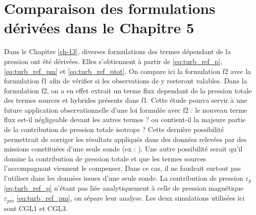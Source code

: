  \section{Comparaison des formulations dérivées dans le Chapitre 5}
 \label{an:compa_form}
 Dans le Chapitre \ref{ch-13}, diverses formulations des termes dépendant de la pression ont été dérivées. Elles s'obtiennent à partir de \eqref{eq:turb_ref_p}, \eqref{eq:turb_ref_pm} et  \eqref{eq:turb_ref_ptot}. On compare ici la formulation f2 avec la formulation f1 afin de vérifier si les observations de  y resteront valables. Dans la formulation f2, on a en effet extrait un terme flux dependant de la pression totale des termes sources et hybrides présents dans f1. Cette étude pourra servir à une future application observationnelle d'une loi formulée avec f2 : le nouveau terme flux est-il négligeable devant les autres termes ? ou contient-il la majeure partie de la contribution de pression totale isotrope ? Cette dernière possibilité permettrait de corriger les résultats appliqués dans des données relevées par des missions constituées d'une seule sonde (ex : ). Une autre possibilité serait qu'il domine la contribution de pression totale et que les termes sources l'accompagnant viennent le compenser. Dans ce cas, il ne faudrait surtout pas l'utiliser dans les données issues d'une seule sonde. La contribution de pression $\varepsilon_{p}$ \eqref{eq:turb_ref_p} n'étant pas liée analytiquement à celle de pression magnétique $\varepsilon_{pm}$ \eqref{eq:turb_ref_pm}, on sépare leur analyse. Les deux simulations utilisées ici sont CGL1 et CGL3.
 
